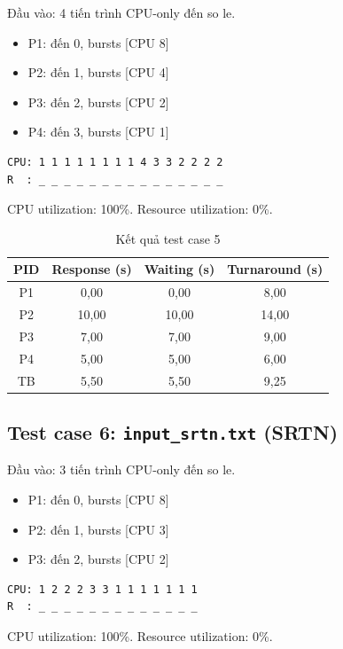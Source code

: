 Đầu vào: 4 tiến trình CPU-only đến so le.

\begin{itemize}
    \item P1: đến 0, bursts [CPU 8]
    \item P2: đến 1, bursts [CPU 4]
    \item P3: đến 2, bursts [CPU 2]
    \item P4: đến 3, bursts [CPU 1]
\end{itemize}

\begin{verbatim}
CPU: 1 1 1 1 1 1 1 1 4 3 3 2 2 2 2
R  : _ _ _ _ _ _ _ _ _ _ _ _ _ _ _
\end{verbatim}

CPU utilization: 100\%. Resource utilization: 0\%.

\begin{table}[h]
\centering
\begin{tabular}{|c|c|c|c|}
\hline
PID & Response (s) & Waiting (s) & Turnaround (s) \\
\hline
P1 & 0,00 & 0,00 & 8,00 \\
P2 & 10,00 & 10,00 & 14,00 \\
P3 & 7,00 & 7,00 & 9,00 \\
P4 & 5,00 & 5,00 & 6,00 \\
\hline
TB & 5,50 & 5,50 & 9,25 \\
\hline
\end{tabular}
\caption{Kết quả test case 5}
\end{table}

\subsection{Test case 6: \texttt{input\_srtn.txt} (SRTN)}

Đầu vào: 3 tiến trình CPU-only đến so le.

\begin{itemize}
    \item P1: đến 0, bursts [CPU 8]
    \item P2: đến 1, bursts [CPU 3]
    \item P3: đến 2, bursts [CPU 2]
\end{itemize}

\begin{verbatim}
CPU: 1 2 2 2 3 3 1 1 1 1 1 1 1
R  : _ _ _ _ _ _ _ _ _ _ _ _ _
\end{verbatim}

CPU utilization: 100\%. Resource utilization: 0\%.

